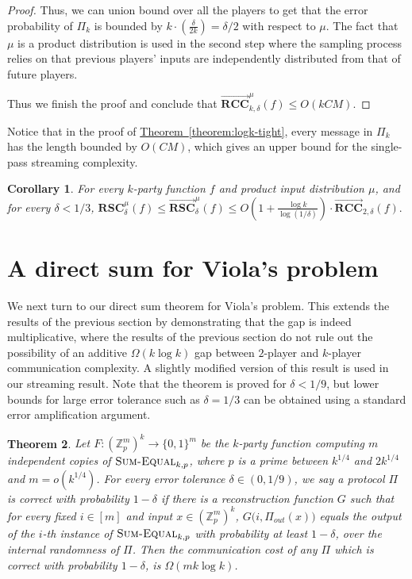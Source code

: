 \documentclass[11pt]{article}
\numberwithin{equation}{section}
\newtheorem{theorem}{Theorem}[section]
\newtheorem{corollary}[theorem]{Corollary}
\theoremstyle{definition}
\theoremstyle{plain}
\newcommand{\Z}{\mathbb Z}
\newcommand{\expref}[2]{\hyperref[#2]{#1~\ref{#2}}}
\newcommand{\zo}{\ensuremath{ \{ 0, 1 \} }}
\newcommand{\error}{\ensuremath{\delta}}
\newcommand{\bigo}[1]{\ensuremath{{{O} \left( {#1} \right)}}}
\newcommand{\bigomega}[1]{\ensuremath{{\Omega \left( {#1} \right)}}}
\newcommand{\rsc}{\ensuremath{\mathbf{RSC}}}
\newcommand{\rccone}{\ensuremath{\overrightarrow{\mathbf{RCC}}}}
\newcommand{\rscone}{\ensuremath{\overrightarrow{\mathbf{RSC}}}}
\newcommand{\sumequal}{\textsc{Sum-Equal} }
\begin{document}
\begin{proof}
Thus, we can union bound over all the players to get that the error probability of $\Pi_k$ is bounded by $k\cdot (\frac{\error}{2k})=\error/2$ with respect to $\mu$.
The fact that $\mu$ is a product distribution is used in the second step where the sampling process relies on that previous players' inputs are independently distributed from that of future players.

Thus we finish the proof and conclude that 
$\rccone_{k,\error}^{\mu}(f)\le \bigo{kCM}$.
\end{proof}


Notice that in the proof of \expref{Theorem}{theorem:logk-tight}, every message in $\Pi_k$ has the length bounded by $\bigo{CM}$, which gives an upper bound for the single-pass streaming complexity.

\begin{corollary}\label{corollary:separation upper bound}
For every $k$-party function $f$ and product input distribution $\mu$, and for every $\error < 1/3$, 
$\rsc_{\error}^{\mu}(f) \le\rscone_{\error}^{\mu}(f) \le  \bigo{1+\frac{\log k}{\log(1/\error)}} \cdot \rccone_{2,\error}(f).$
\end{corollary}


\section{A direct sum for Viola's problem}
We next turn to our direct sum theorem for Viola's problem. {\color{black}This extends the results of the previous section by demonstrating that the gap is indeed multiplicative, where the results of the previous section do not rule out the possibility of an additive $\Omega(k \log k)$ gap between $2$-player and $k$-player communication complexity. A slightly modified version of this result is used in our streaming result.}
Note that the theorem is proved for $\error < 1/9$, but lower bounds for large error tolerance such as $\error=1/3$ can be obtained using a standard error amplification argument.

	\begin{theorem}\label{thm:A1}
		Let $F:\left(\Z_p^m\right)^k \to \zo^m$ be the $k$-party function computing $m$ independent copies of $\sumequal_{k,p}$, where $p$ is a prime between $k^{1/4}$ and $2k^{1/4}$ {\color{black}and $m = o(k^{1/4})$.}
		For every error tolerance $\error\in(0,1/9)$,  
        we say a protocol $\Pi$ is \emph{correct with probability $1-\error$}
		if there is a reconstruction
		function $G$ such that for every fixed $i \in [m]$ and input $x\in \left(\Z_p^m\right)^k$, $G\big(i, \Pi_{out}(x)\big)$ equals the
		output of the $i$-th instance of $\sumequal_{k,p}$ with probability at least
		$1-\error$, over the internal randomness of $\Pi$. 
		Then the communication cost of any $\Pi$ which is correct with probability $1-\error$, is $\bigomega{m k\log k}$.
	\end{theorem}
\end{document}
